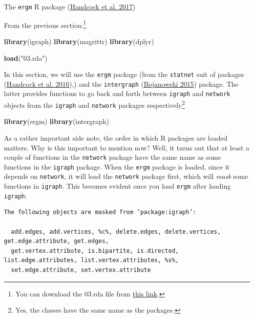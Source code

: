 \documentclass[
]{book}
\newenvironment{Shaded}{\begin{snugshade}}{\end{snugshade}}
\newcommand{\FunctionTok}[1]{\textcolor[rgb]{0.13,0.29,0.53}{\textbf{#1}}}
\newcommand{\NormalTok}[1]{#1}
\newcommand{\StringTok}[1]{\textcolor[rgb]{0.31,0.60,0.02}{#1}}
\begin{document}
The \texttt{ergm} R package (\protect\hyperlink{ref-R-ergm}{Handcock et al. 2017})

From the previous section:\footnote{You can download the 03.rda file from \href{https://github.com/gvegayon/appliedsnar}{this link}.}

\begin{Shaded}
\begin{Highlighting}[]
\FunctionTok{library}\NormalTok{(igraph)}
\FunctionTok{library}\NormalTok{(magrittr)}
\FunctionTok{library}\NormalTok{(dplyr)}

\FunctionTok{load}\NormalTok{(}\StringTok{"03.rda"}\NormalTok{)}
\end{Highlighting}
\end{Shaded}

In this section, we will use the \texttt{ergm} package (from the \texttt{statnet} suit of packages (\protect\hyperlink{ref-R-statnet}{Handcock et al. 2016}),) and the \texttt{intergraph} (\protect\hyperlink{ref-R-intergraph}{Bojanowski 2015}) package. The latter provides functions to go back and forth between \texttt{igraph} and \texttt{network} objects from the \texttt{igraph} and \texttt{network} packages respectively\footnote{Yes, the classes have the same name as the packages.}

\begin{Shaded}
\begin{Highlighting}[]
\FunctionTok{library}\NormalTok{(ergm)}
\FunctionTok{library}\NormalTok{(intergraph)}
\end{Highlighting}
\end{Shaded}

As a rather important side note, the order in which R packages are loaded matters. Why is this important to mention now? Well, it turns out that at least a couple of functions in the \texttt{network} package have the same name as some functions in the \texttt{igraph} package. When the \texttt{ergm} package is loaded, since it depends on \texttt{network}, it will load the \texttt{network} package first, which will \emph{mask} some functions in \texttt{igraph}. This becomes evident once you load \texttt{ergm} after loading \texttt{igraph}:

\begin{verbatim}
The following objects are masked from ‘package:igraph’:

  add.edges, add.vertices, %c%, delete.edges, delete.vertices, get.edge.attribute, get.edges,
  get.vertex.attribute, is.bipartite, is.directed, list.edge.attributes, list.vertex.attributes, %s%,
  set.edge.attribute, set.vertex.attribute
\end{verbatim}
\end{document}
